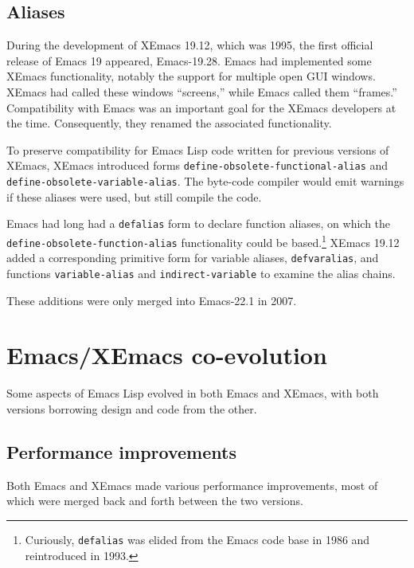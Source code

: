 \documentclass[format=acmsmall, review]{acmart}
\newcommand \Elisp {Emacs Lisp}
\begin{document}
\subsection{Aliases}

During the development of XEmacs 19.12, which was 1995, the first
official release of Emacs 19 appeared, Emacs-19.28.  Emacs had
implemented some XEmacs functionality, notably the support for
multiple open GUI windows.  XEmacs had called these windows
``screens,'' while Emacs called them ``frames.''  Compatibility with
Emacs was an important goal for the XEmacs developers at the time.
Consequently, they renamed the associated functionality.

To preserve compatibility for \Elisp{} code written for previous
versions of XEmacs, XEmacs introduced forms
\texttt{define-obsolete-functional-alias} and
\texttt{define-obsolete-variable-alias}.  The byte-code compiler would
emit warnings if these aliases were used, but still compile the code.

Emacs had long had a \texttt{defalias} form to declare function
aliases, on which the \texttt{define-\linebreak[0]obsolete-\linebreak[0]function-\linebreak[0]alias}
functionality could be based.\footnote{Curiously, \texttt{defalias}
  was elided from the Emacs code base in 1986 and reintroduced in
  1993.}  XEmacs 19.12 added a corresponding primitive form for variable
aliases, \texttt{defvaralias}, and functions \texttt{variable-alias}
and \texttt{indirect-variable} to examine the alias chains.

These additions were only merged into Emacs-22.1 in 2007.

\section{Emacs/XEmacs co-evolution}
\label{sec:coevolution}

Some aspects of \Elisp{} evolved in both Emacs and XEmacs, with both
versions borrowing design and code from the other.

\subsection{Performance improvements}

Both Emacs and XEmacs made various performance improvements, most of
which were merged back and forth between the two versions.
\end{document}
